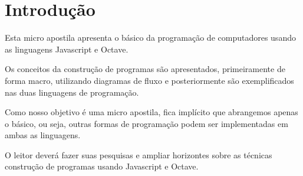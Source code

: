 \section{Introdução}
\label{intro}

Esta micro apostila apresenta o básico da programação de computadores usando as linguagens Javascript e Octave. 

Os conceitos da construção de programas são apresentados, primeiramente de forma macro, utilizando diagramas de fluxo e posteriormente são exemplificados nas duas linguagens de programação.

Como nosso objetivo é uma micro apostila, fica implícito que abrangemos apenas o básico, ou seja, outras formas de programação podem ser implementadas em ambas as linguagens. 

O leitor deverá fazer suas pesquisas e ampliar horizontes sobre as técnicas construção de programas usando Javascript e Octave.
